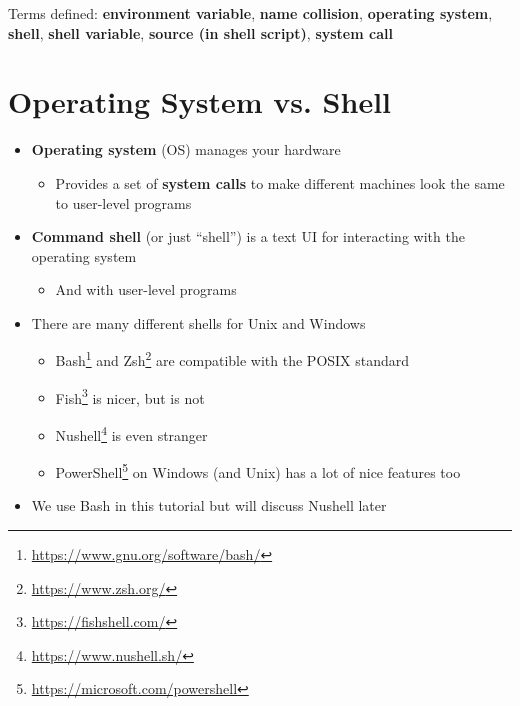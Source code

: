 \documentclass[krantzl]{krantz}
\newcommand{\glossref}[1]{\textbf{#1}}
\newcommand{\hreffoot}[2]{{#1}\footnote{\href{#2}{#2}}}
\begin{document}
Terms defined: 
\glossref{environment variable}, \glossref{name collision}, \glossref{operating system}, \glossref{shell}, \glossref{shell variable}, \glossref{source (in shell script)}, \glossref{system call}


\section{Operating System vs. Shell}
\begin{itemize}
\item \glossref{Operating system} (OS) manages your hardware\begin{itemize}
\item Provides a set of \glossref{system calls}
    to make different machines look the same to user-level programs

\end{itemize}


\item \glossref{Command shell} (or just “shell”) is a text UI for interacting with the operating system\begin{itemize}
\item And with user-level programs

\end{itemize}


\item There are many different shells for Unix and Windows\begin{itemize}
\item \hreffoot{Bash}{https://www.gnu.org/software/bash/} and \hreffoot{Zsh}{https://www.zsh.org/} are compatible with the POSIX standard

\item \hreffoot{Fish}{https://fishshell.com/} is nicer, but is not

\item \hreffoot{Nushell}{https://www.nushell.sh/} is even stranger

\item \hreffoot{PowerShell}{https://microsoft.com/powershell} on Windows (and Unix) has a lot of nice features too

\end{itemize}


\item We use Bash in this tutorial but will discuss Nushell later

\end{itemize}
\end{document}
